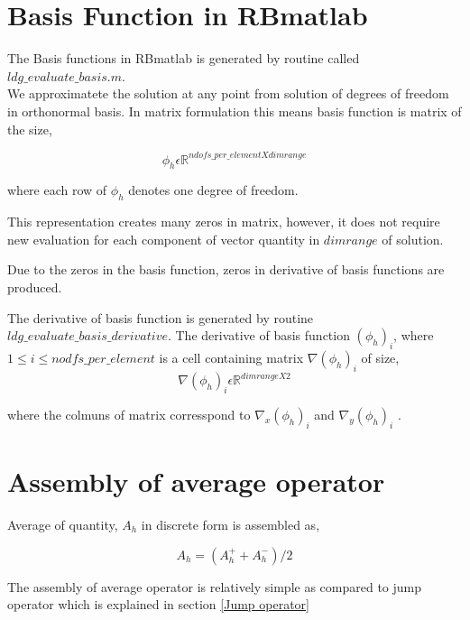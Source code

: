 \documentclass[a4paper,12pt]{book}
\begin{document}
\section{Basis Function in RBmatlab}

The Basis functions in RBmatlab is generated by routine called $ldg\_evaluate\_basis.m$.\\

We approximatete the solution at any point from solution of degrees of freedom in orthonormal basis. In matrix formulation this means basis function is matrix of the size,

\begin{equation}\label{basis_func_rbmatlab}
\phi_h \epsilon \mathbb{R}^{ndofs\_per\_element X dimrange}
\end{equation}

where each row of $\phi_h$ denotes one degree of freedom.

This representation creates many zeros in matrix, however, it does not require new evaluation for each component of vector quantity in $dimrange$ of solution.

Due to the zeros in the basis function, zeros in derivative of basis functions are produced. 

The derivative of basis function is generated by routine $ldg\_evaluate\_basis\_derivative$. The derivative of basis function $(\phi_h)_{i}$, where $1 \leq i \leq nodfs\_per\_element$ is a cell containing matrix $\nabla (\phi_h)_{i}$ of size,
\begin{equation}\label{basis_func_derivative_rbmatlab}
\nabla (\phi_h)_{i} \epsilon \mathbb{R}^{{dimrange} X 2}
\end{equation}

where the colmuns of matrix corresspond to $\nabla_x (\phi_h)_{i}$ and $\nabla_y (\phi_h)_{i}$ .

\section{Assembly of average operator}

Average of quantity, $A_h$ in discrete form is assembled as,

\begin{equation}\label{Average operator}
{A_h} = (A_h^+ + A_h^-)/2
\end{equation}

The assembly of average operator is relatively simple as compared to jump operator which is explained in section \ref{Jump operator}
\end{document}

